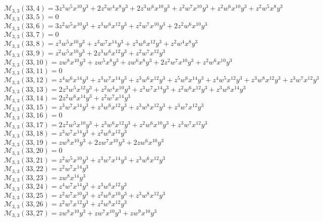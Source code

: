 $\mathcal{M}_{3,3}(33,4)=3z^3w^5x^{10}y^3+2z^2w^4x^8y^3+2z^3w^6x^{10}y^3+z^2w^7x^{10}y^3+z^2w^6x^{10}y^3+z^2w^5x^8y^3$\\
$\mathcal{M}_{3,3}(33,5)=0$\\
$\mathcal{M}_{3,3}(33,6)=3z^2w^5x^{10}y^3+z^3w^6x^{12}y^3+z^2w^7x^{10}y^3+2z^2w^6x^{10}y^3$\\
$\mathcal{M}_{3,3}(33,7)=0$\\
$\mathcal{M}_{3,3}(33,8)=z^3w^5x^{10}y^3+z^3w^7x^{14}y^3+z^3w^6x^{12}y^3+z^2w^4x^8y^3$\\
$\mathcal{M}_{3,3}(33,9)=z^2w^5x^{10}y^3+2z^3w^6x^{12}y^3+z^2w^7x^{12}y^3$\\
$\mathcal{M}_{3,3}(33,10)=zw^8x^{10}y^3+zw^5x^8y^3+zw^6x^8y^3+2z^2w^7x^{10}y^3+z^2w^6x^{10}y^3$\\
$\mathcal{M}_{3,3}(33,11)=0$\\
$\mathcal{M}_{3,3}(33,12)=z^4w^6x^{14}y^3+z^3w^7x^{14}y^3+z^3w^6x^{12}y^3+z^5w^6x^{14}y^3+z^4w^5x^{12}y^3+z^3w^8x^{12}y^3+z^3w^7x^{12}y^3$\\
$\mathcal{M}_{3,3}(33,13)=2z^3w^5x^{12}y^3+z^2w^4x^{10}y^3+z^3w^7x^{14}y^3+z^2w^6x^{12}y^3+z^3w^6x^{14}y^3$\\
$\mathcal{M}_{3,3}(33,14)=2z^2w^6x^{14}y^3+z^2w^7x^{14}y^3$\\
$\mathcal{M}_{3,3}(33,15)=z^3w^7x^{14}y^3+z^3w^6x^{12}y^3+z^3w^8x^{12}y^3+z^3w^7x^{12}y^3$\\
$\mathcal{M}_{3,3}(33,16)=0$\\
$\mathcal{M}_{3,3}(33,17)=2z^2w^5x^{10}y^3+z^3w^6x^{12}y^3+z^2w^6x^{10}y^3+z^3w^7x^{12}y^3$\\
$\mathcal{M}_{3,3}(33,18)=z^3w^7x^{14}y^3+z^2w^6x^{12}y^3$\\
$\mathcal{M}_{3,3}(33,19)=zw^8x^{10}y^3+2zw^7x^{10}y^3+2zw^6x^{10}y^3$\\
$\mathcal{M}_{3,3}(33,20)=0$\\
$\mathcal{M}_{3,3}(33,21)=z^2w^5x^{10}y^3+z^3w^7x^{14}y^3+z^3w^6x^{12}y^3$\\
$\mathcal{M}_{3,3}(33,22)=z^2w^7x^{14}y^3$\\
$\mathcal{M}_{3,3}(33,23)=zw^8x^{14}y^3$\\
$\mathcal{M}_{3,3}(33,24)=z^4w^7x^{14}y^3+z^3w^6x^{12}y^3$\\
$\mathcal{M}_{3,3}(33,25)=z^2w^7x^{10}y^3+z^2w^6x^{10}y^3+z^3w^8x^{12}y^3$\\
$\mathcal{M}_{3,3}(33,26)=z^2w^7x^{12}y^3+z^2w^8x^{12}y^3$\\
$\mathcal{M}_{3,3}(33,27)=zw^8x^{10}y^3+zw^7x^{10}y^3+zw^9x^{10}y^3$\\
